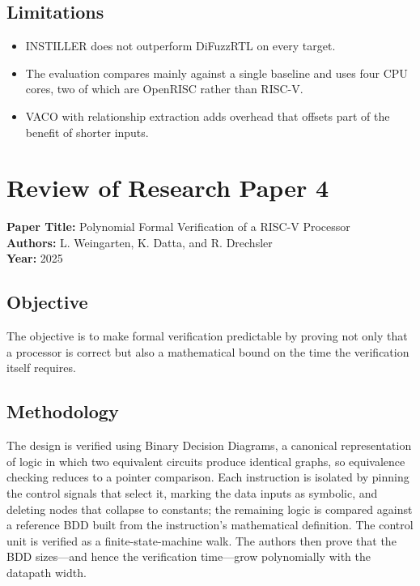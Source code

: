 \documentclass[12pt,a4paper]{report}
\begin{document}
\subsection{Limitations}
\begin{itemize}[nosep]
  \item INSTILLER does not outperform DiFuzzRTL on every target.
  \item The evaluation compares mainly against a single baseline and uses four CPU
        cores, two of which are OpenRISC rather than RISC-V.
  \item VACO with relationship extraction adds overhead that offsets part of the
        benefit of shorter inputs.
\end{itemize}

\section{Review of Research Paper 4}
\noindent\textbf{Paper Title:} Polynomial Formal Verification of a RISC-V Processor\\
\textbf{Authors:} L. Weingarten, K. Datta, and R. Drechsler\\
\textbf{Year:} 2025

\subsection{Objective}
The objective is to make formal verification predictable by proving not only that a
processor is correct but also a mathematical bound on the time the verification itself
requires.

\subsection{Methodology}
The design is verified using Binary Decision Diagrams, a canonical representation of logic
in which two equivalent circuits produce identical graphs, so equivalence checking reduces
to a pointer comparison. Each instruction is isolated by pinning the control signals that
select it, marking the data inputs as symbolic, and deleting nodes that collapse to
constants; the remaining logic is compared against a reference BDD built from the
instruction's mathematical definition. The control unit is verified as a finite-state-machine
walk. The authors then prove that the BDD sizes---and hence the verification time---grow
polynomially with the datapath width.
\end{document}
